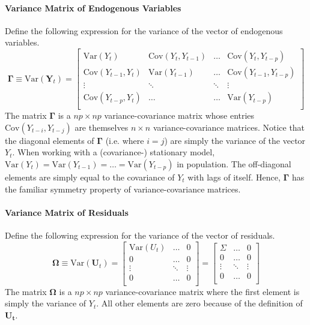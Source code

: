 \documentclass[12pt]{article}
\newcommand{\Var}{\mathrm{Var}}
\newcommand{\Cov}{\mathrm{Cov}}
\begin{document}
\paragraph{Variance Matrix of Endogenous Variables}

Define the following expression for the variance of the vector of endogenous variables.
$$ \mathbf{\Gamma} \equiv \Var(\mathbf{Y}_t) = 
\begin{bmatrix}
\Var(Y_t) & \Cov(Y_t, Y_{t-1}) & \dots & \Cov(Y_t, Y_{t-p}) \\
\Cov(Y_{t-1},Y_t) & \Var(Y_{t-1}) & \dots & \Cov(Y_{t-1}, Y_{t-p}) \\
\vdots & \ddots & \ddots & \vdots \\
\Cov(Y_{t-p},Y_t) & \dots & \dots & \Var(Y_{t-p}) \\
\end{bmatrix}$$
The matrix $\mathbf{\Gamma}$ is a $np \times np$ variance-covariance matrix whose entries $\Cov(Y_{t-i}, Y_{t-j})$ are themselves $n \times n$ variance-covariance matrices. Notice that the diagonal elements of $\mathbf{\Gamma}$ (i.e. where $i = j$) are simply the variance of the vector $Y_t$. When working with a (covariance-) stationary model, $\Var(Y_t) = \Var(Y_{t-1}) = \dots = \Var(Y_{t-p})$ in population. The off-diagonal elements are simply equal to the covariance of $Y_t$ with lags of itself. Hence, $\mathbf{\Gamma}$ has the familiar symmetry property of variance-covariance matrices. 

\paragraph{Variance Matrix of Residuals}

Define the following expression for the variance of the vector of residuals.
$$ \mathbf{\Omega} \equiv \Var(\mathbf{U}_t) = 
\begin{bmatrix}
\Var(U_t) & \dots & 0 \\
0 & \dots & 0 \\
\vdots & \ddots & \vdots \\
0 & \dots &0 \\
\end{bmatrix}
=
\begin{bmatrix}
\Sigma & \dots & 0 \\
0 & \dots & 0 \\
\vdots & \ddots & \vdots \\
0 & \dots &0 \\
\end{bmatrix}$$
The matrix $\mathbf{\Omega}$ is a $np \times np$ variance-covariance matrix where the first element is simply the variance of $Y_t$. All other elements are zero because of the definition of $\mathbf{U_t}$.
\end{document}
